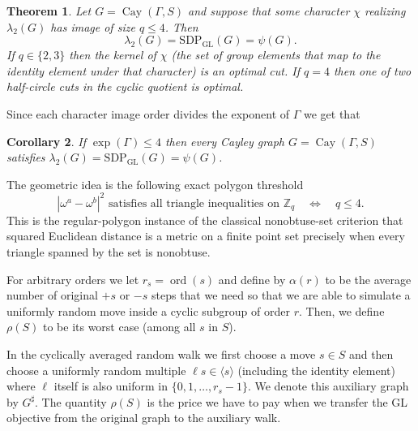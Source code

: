 \documentclass[11pt]{article}
\newtheorem{theorem}{Theorem}[section]
\newtheorem{corollary}[theorem]{Corollary}
\theoremstyle{definition}
\theoremstyle{remark}
\newcommand{\Z}{\mathbb{Z}}
\newcommand{\Cay}{\operatorname{Cay}}
\newcommand{\ord}{\operatorname{ord}}
\newcommand{\gl}{\operatorname{SDP_{GL}}}
\begin{document}
\begin{theorem}
\label{thm:intro-exact}
Let $G=\Cay(\Gamma,S)$ and suppose that some character $\chi$ realizing $\lambda_2(G)$ has image of size $q \leq 4$. Then 
\[
    \lambda_2(G)=\gl(G)=\psi(G).
\]
If $q \in \{2,3\}$ then the kernel of $\chi$ (the set of group elements that map to the identity element under that character) is an optimal cut. If $q=4$ then one of two half-circle cuts in the cyclic quotient is optimal.
\end{theorem}

Since each character image order divides the exponent of $\Gamma$ we get that

\begin{corollary}\label{cor:intro-exp4}
If $\exp(\Gamma)\le4$ then every Cayley graph $G=\Cay(\Gamma,S)$ satisfies $\lambda_2(G)=\gl(G)=\psi(G)$.
\end{corollary}

The geometric idea is the following exact polygon threshold 
\[
  |\omega^a- \omega^b|^2\text{ satisfies all triangle inequalities on }\Z_q
  \quad\Longleftrightarrow\quad q\le4.
\]
This is the regular-polygon instance of the classical nonobtuse-set criterion that squared Euclidean distance is a metric on a finite point set precisely when every triangle spanned by the set is nonobtuse.


For arbitrary orders we let $r_s=\ord(s)$ and  define by $\alpha(r)$ to be the average number of original $+s$ or $-s$ steps that we need so that we are able to simulate a uniformly random move inside a cyclic subgroup of order $r$. Then, we define $\rho(S)$ to be its worst case (among all $s$ in $S$).

In the cyclically averaged random walk we first choose a move $s\in S$ and then choose a uniformly random  multiple $\ell s\in\langle s\rangle$  (including the identity element) where $\ell$ itself is also uniform in $\{0,1, \dots, r_s-1\}$. We denote this auxiliary graph by $G^\sharp$. The quantity $\rho(S)$ is the  price we have to pay when we transfer the GL objective from the original graph to the auxiliary walk.
\end{document}
